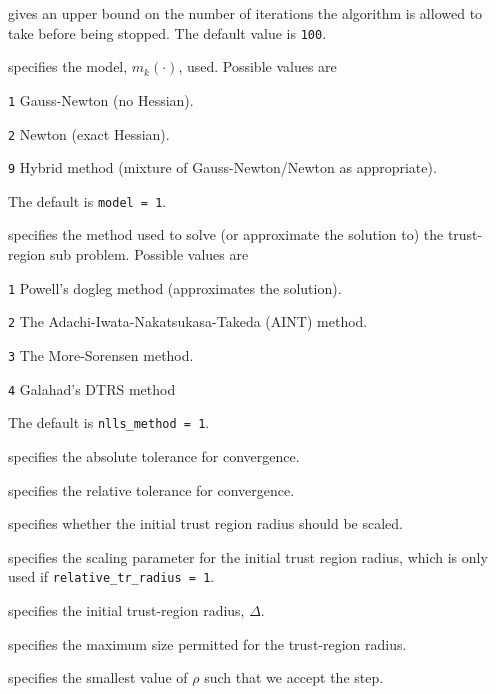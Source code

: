 \documentclass{spec}
\begin{document}
\begin{description}

 gives an upper bound on the number
of iterations the algorithm is allowed to take before being stopped.  The default value is {\tt 100}.

 specifies the model, $m_k(\cdot)$, used.  Possible values are
\begin{description}
  \item{\tt 1} Gauss-Newton (no Hessian).
  \item{\tt 2} Newton (exact Hessian).
  \item{\tt 9} Hybrid method (mixture of Gauss-Newton/Newton as appropriate).
\end{description}
The default is {\tt model = 1}.

 specifies the method used to solve
(or approximate the solution to) the trust-region sub problem.  Possible values are
\begin{description}
  \item{\tt 1} Powell's dogleg method (approximates the solution).
  \item{\tt 2} The Adachi-Iwata-Nakatsukasa-Takeda (AINT) method.
  \item{\tt 3} The More-Sorensen method.
  \item{\tt 4} Galahad's DTRS method
\end{description}
The default is {\tt nlls\_method = 1}.

 specifies the absolute tolerance for convergence.

 specifies the relative tolerance for convergence.

 specifies whether the initial trust region
radius should be scaled.

 specifies the scaling parameter for the initial trust region radius, which is only used if {\tt relative\_tr\_radius = 1}.

 specifies the initial trust-region radius, $\Delta$.

 specifies the maximum size permitted for the trust-region radius.

 specifies the smallest value of $\rho$ such that we accept the step.


\end{description}
\end{document}

